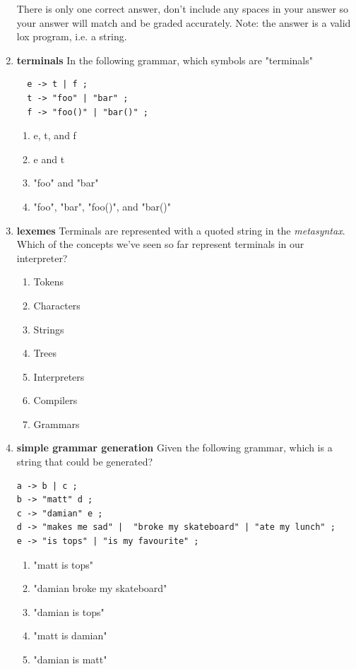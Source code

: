 \documentclass[twoside=false, DIV=14]{scrartcl}
\begin{document}
\begin{enumerate}
  There is only one correct answer, don't include any spaces in your answer so your answer will match and be graded accurately.  Note: the answer is a valid lox program, i.e. a string.%
  

  \item \textbf{terminals}
  In the following grammar, which symbols are "terminals"
  \begin{lstlisting}
  e -> t | f ;
  t -> "foo" | "bar" ;
  f -> "foo()" | "bar()" ;
  \end{lstlisting}
  \begin{enumerate}
    \item e, t, and f
    \item e and t
    \item "foo" and "bar"
    \item \tick "foo", "bar", "foo()", and "bar()"
  \end{enumerate}
  
\item \textbf{lexemes}
Terminals are represented with a quoted string in the \emph{metasyntax}.  Which of the concepts we've seen so far represent terminals in our interpreter?
\begin{enumerate}
    \item \tick Tokens
    \item Characters
    \item Strings
    \item Trees
    \item Interpreters
    \item Compilers
    \item Grammars
\end{enumerate}

\item \textbf{simple grammar generation}
Given the following grammar, which is a string that could be generated?
\begin{lstlisting}
a -> b | c ;
b -> "matt" d ;
c -> "damian" e ;
d -> "makes me sad" |  "broke my skateboard" | "ate my lunch" ;
e -> "is tops" | "is my favourite" ;
\end{lstlisting}
\begin{enumerate}
    \item "matt is tops"
    \item "damian broke my skateboard"
    \item \tick "damian is tops"
    \item "matt is damian"
    \item "damian is matt"
\end{enumerate}

\end{enumerate}
\end{document}
